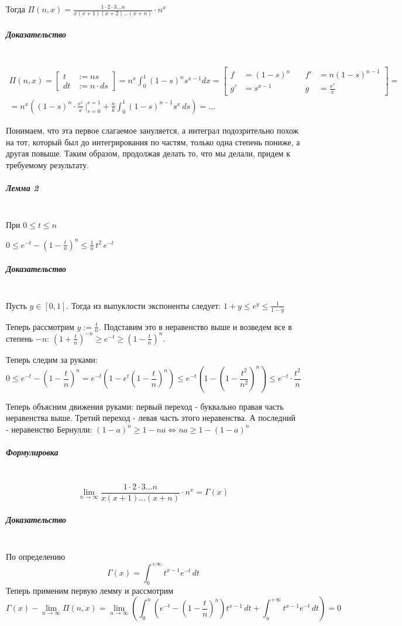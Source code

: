 \documentclass{article}
\let\vanillasubparagraph\subparagraph
\renewcommand{\subparagraph}[1]{\vanillasubparagraph{#1}\mbox{}\\}
\begin{document}
Тогда $\Pi(n, x) =\frac{1 \cdot 2 \cdot 3 \dots n} {x(x+1)(x+2)\dots(x+n)} \cdot n^x$
\subparagraph{Доказательство}

\begin{multline*}
\Pi(n, x) = \left[
    \begin{alignedat}{2}
        t &:= ns \\
        dt &:= n\cdot d s
    \end{alignedat}
\right] = n^x\int_0^1(1-s)^ns^{x-1}dx = \left[
    \begin{alignedat}{2}
        f &= (1-s)^n &\quad f' &= n(1-s)^{n-1} \\
        g' &= s^{x-1} &\quad g &= \frac{s^x}{x}
    \end{alignedat}
\right] =\\ =n^x\left((1-s)^n \cdot \frac{s^x}{x}\,\bigg|_{s=0}^{s=1} + \frac{n}{k}\int_0^1 (1-s)^{n-1}s^x\, ds\right) = \dots
\end{multline*}

Понимаем, что эта первое слагаемое зануляется, а интеграл подозрительно похож на тот, который был до интегрирования по частям, только одна степень пониже, а другая повыше. Таким образом, продолжая делать то, что мы делали, придем к требуемому результату.

\subparagraph{Лемма 2}
При $0 \leq t \leq n$ 

$0 \leq e^{-t} - \left(1 - \frac{t}{n}\right)^n \leq\frac{1}{n}\,t^2\,e^{-t}$
\subparagraph{Доказательство}
Пусть $y \in [0, 1]$. Тогда из выпуклости экспоненты следует: $1 + y \leq e^y \leq \frac{1}{1-y}$

Теперь рассмотрим $y:= \frac{t}{n}$. Подставим это в неравенство выше и возведем все в степень $-n$: $\left(1 + \frac{t}{n}\right)^{-n} \geq e^{-t} \geq \left(1 - \frac{t}{n}\right)^n$.

Теперь следим за руками:
$$
0 \leq e^{-t} - \left(1 - \frac{t}{n}\right)^n = e^{-t}\left(1 - e^t\left(1 - \frac{t}{n}\right)^n\right) \leq e^{-t}\left(1 - \left(1 - \frac{t^2}{n^2}\right)^n\right) \leq e^{-t} \cdot \frac{t^2}{n}
$$

Теперь объясним движения руками: первый переход - буквально правая часть неравенства выше. Третий переход - левая часть этого неравенства. А последний - неравенство Бернулли: $(1-a)^n \geq 1 - na \Leftrightarrow na \geq 1 - (1-a)^n$

\subparagraph{Формулировка}
$$
\lim_{n\to \infty} \frac{1 \cdot 2 \cdot 3 \dots n}{x(x+1)\dots(x+n)} \cdot n^x = \Gamma(x)
$$
\subparagraph{Доказательство}
По определению 
$$
\Gamma(x) = \int_0^{+\infty} t^{x-1} e^{-t}\,dt
$$
Теперь применим первую лемму и рассмотрим 
$$
\Gamma(x) - \lim_{n\to \infty} \Pi(n, x) = \lim_{n\to \infty} \left(\int_0^n \left(e^{-t} - \left(1 - \frac{t}{n}\right)^n\right)t^{x-1}\,dt + \int_n^{+\infty} t^{x-1} e^{-t}\,dt\right) = 0
$$
\end{document}
